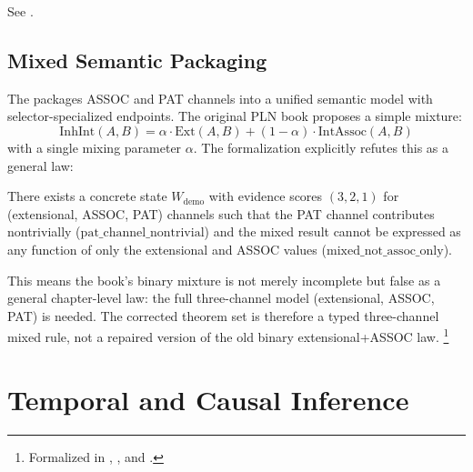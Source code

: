 \documentclass[11pt,openany]{report}
\begin{document}
See .

\section{Mixed Semantic Packaging}

The  packages ASSOC and PAT channels into a
unified semantic model with selector-specialized endpoints.  The original
PLN book proposes a simple mixture:
\[
  \mathrm{InhInt}(A, B) = \alpha \cdot \mathrm{Ext}(A, B)
  + (1 - \alpha) \cdot \mathrm{IntAssoc}(A, B)
\]
with a single mixing parameter $\alpha$.  The formalization explicitly
refutes this as a general law:

\begin{theorem}
\label{thm:no-mixed-policy}
There exists a concrete state $W_{\mathrm{demo}}$ with evidence scores
$(3, 2, 1)$ for (extensional, ASSOC, PAT) channels such that the PAT
channel contributes nontrivially ($\mathrm{pat\_channel\_nontrivial}$) and
the mixed result cannot be expressed as any function of only the
extensional and ASSOC values ($\mathrm{mixed\_not\_assoc\_only}$).
\end{theorem}

This means the book's binary mixture is not merely incomplete but false
as a general chapter-level law: the full three-channel model
(extensional, ASSOC, PAT) is needed.
The corrected theorem set is therefore a typed three-channel mixed
rule, not a repaired version of the old binary extensional+ASSOC law.%
\footnote{Formalized in ,
  , and
  .}


\chapter{Temporal and Causal Inference}
\label{ch:temporal}
\end{document}
